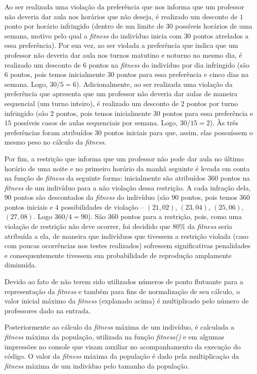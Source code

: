 \documentclass[12pt]{article}
\begin{document}
Ao ser realizada uma violação da preferência que nos informa que um professor não deveria dar aula nos horários que não deseja, é realizado um desconto de $1$ ponto por horário infringido (dentro de um limite de $30$ possíveis horários de uma semana, motivo pelo qual a \textit{fitness} do indivíduo inicia com $30$ pontos atrelados a essa preferência). Por sua vez, ao ser violada a preferência que indica que um professor não deveria dar aula nos turnos matutino e noturno no mesmo dia, é realizado um desconto de 6 pontos na \textit{fitness} do indivíduo por dia infringido (são $6$ pontos, pois temos inicialmente $30$ pontos para essa preferência e cinco dias na semana. Logo, $30 / 5 = 6$). Adicionalmente, ao ser realizada uma violação da preferência que apresenta que um professor não deveria dar aulas de maneira sequencial (um turno inteiro), é realizado um desconto de $2$ pontos por turno infringido (são 2 pontos, pois temos inicialmente $30$ pontos para essa preferência e $15$ possíveis casos de aulas sequenciais por semana. Logo, $30 / 15 = 2$). Às três preferências foram atribuídos $30$ pontos iniciais para que, assim, elas possuíssem o mesmo peso no cálculo da \textit{fitness}.

Por fim, a restrição que informa que um professor não pode dar aula no último horário de uma noite e no primeiro horário da manhã seguinte é levada em conta na função de \textit{fitness} da seguinte forma: inicialmente são atribuídos  $360$ pontos na \textit{fitness} de um indivíduo para a não violação dessa restrição. A cada infração dela, $90$ pontos são descontados da \textit{fitness} do indivíduo (são $90$ pontos, pois temos $360$ pontos iniciais e $4$ possibilidades de violação -- $(21,02)$, $(23,04)$, $(25,06)$, $(27,08)$. Logo $360 / 4 = 90 $). São $360$ pontos para a restrição, pois, como uma violação de restrição não deve ocorrer, foi decidido que $80\%$ da \textit{fitness} seria atribuída a ela, de maneira que indivíduos que tivessem a restrição violada (caso com poucas ocorrências nos testes realizados) sofressem significativas penalidades e consequentemente tivessem sua probabilidade de reprodução amplamente diminuída.

Devido ao fato de não terem sido utilizados números de ponto flutuante para a representação da \textit{fitness} e também para fins de normalização de seu cálculo, o valor inicial máximo da \textit{fitness} (explanado acima) é multiplicado pelo número de professores dado na entrada.

Posteriormente ao cálculo da \textit{fitness} máxima de um indivíduo, é calculada a \textit{fitness} máxima da população, utilizada na função \textit{fitness()} e em algumas impressões no console que visam auxiliar no acompanhamento da execução do código. O valor da \textit{fitness} máxima da população é dado pela multiplicação da \textit{fitness} máxima de um indivíduo pelo tamanho da população.
\end{document}
